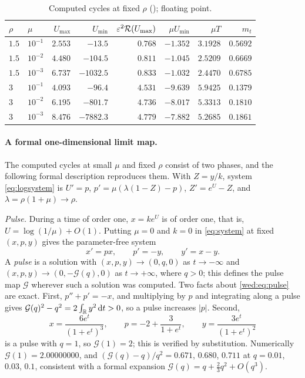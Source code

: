 \begin{table}[ht]
\centering\small
\caption{Computed cycles at fixed $\rho$ (\protect{}); floating point.}\label{wed:tab:fixedrho}
\begin{tabular}{llrrrrrr}
\toprule
$\rho$ & $\mu$ & $U_{\max}$ & $U_{\min}$ & $\varepsilon^2\mathcal R(U_{\max})$ & $\mu U_{\min}$ & $\mu T$ & $m_t$\\
\midrule
$1.5$ & $10^{-1}$ & $2.553$ & $-13.5$ & $0.768$ & $-1.352$ & $3.1928$ & $0.5692$\\
$1.5$ & $10^{-2}$ & $4.480$ & $-104.5$ & $0.811$ & $-1.045$ & $2.5209$ & $0.6669$\\
$1.5$ & $10^{-3}$ & $6.737$ & $-1032.5$ & $0.833$ & $-1.032$ & $2.4470$ & $0.6785$\\
$3$ & $10^{-1}$ & $4.093$ & $-96.4$ & $4.531$ & $-9.639$ & $5.9425$ & $0.1379$\\
$3$ & $10^{-2}$ & $6.195$ & $-801.7$ & $4.736$ & $-8.017$ & $5.3313$ & $0.1810$\\
$3$ & $10^{-3}$ & $8.476$ & $-7882.3$ & $4.779$ & $-7.882$ & $5.2685$ & $0.1861$\\
\bottomrule
\end{tabular}
\end{table}

\paragraph{A formal one-dimensional limit map.}
The computed cycles at small $\mu$ and fixed $\rho$ consist of two phases, and the following formal description reproduces them. With $Z=y/k$, system \eqref{eq:logsystem} is $U'=p$, $p'=\mu(\lambda(1-Z)-p)$, $Z'=e^U-Z$, and $\lambda=\rho(1+\mu)\to\rho$.

\emph{Pulse.} During a time of order one, $x=ke^U$ is of order one, that is, $U=\log(1/\mu)+O(1)$. Putting $\mu=0$ and $k=0$ in \eqref{eq:system} at fixed $(x,p,y)$ gives the parameter-free system
\begin{equation}\label{wed:eq:pulse}
x'=px,\qquad p'=-y,\qquad y'=x-y .
\end{equation}
A \emph{pulse} is a solution with $(x,p,y)\to(0,q,0)$ as $t\to-\infty$ and $(x,p,y)\to(0,-\mathcal G(q),0)$ as $t\to+\infty$, where $q>0$; this defines the pulse map $\mathcal G$ wherever such a solution was computed. Two facts about \eqref{wed:eq:pulse} are exact. First, $p''+p'=-x$, and multiplying by $p$ and integrating along a pulse gives $\mathcal G(q)^2-q^2=2\int_{\mathbb R}y^2\,\mathrm dt>0$, so a pulse increases $|p|$. Second,
\begin{equation}\label{wed:eq:exactpulse}
x=\frac{6e^t}{(1+e^t)^3},\qquad p=-2+\frac{3}{1+e^t},\qquad y=\frac{3e^t}{(1+e^t)^2}
\end{equation}
is a pulse with $q=1$, so $\mathcal G(1)=2$; this is verified by substitution. Numerically $\mathcal G(1)=2.00000000$, and $(\mathcal G(q)-q)/q^2=0.671$, $0.680$, $0.711$ at $q=0.01$, $0.03$, $0.1$, consistent with a formal expansion $\mathcal G(q)=q+\tfrac23q^2+O(q^3)$.

